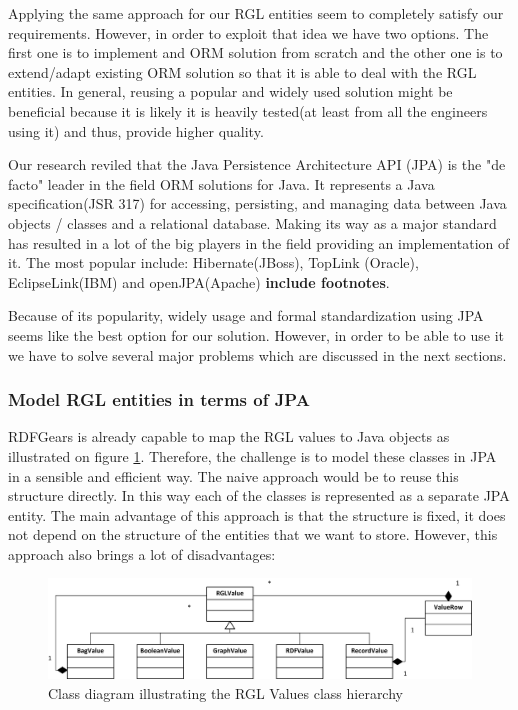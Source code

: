 Applying the same approach for our RGL entities seem to completely satisfy our requirements. However, in order to exploit that idea we have two options. The first one is to implement and ORM solution from scratch and the other one is to extend/adapt existing ORM solution so that it is able to deal with the RGL entities. In general, reusing a popular and widely used solution might be beneficial because it is likely it is heavily tested(at least from all the engineers using it) and thus, provide higher quality. 

Our research reviled that the Java Persistence Architecture API (JPA) is the "de facto" leader in the field ORM solutions for Java. It represents a Java specification(JSR 317) for accessing, persisting, and managing data between Java objects / classes and a relational database. Making its way as a major standard has resulted in a lot of the big players in the field providing an implementation of it. The most popular include: Hibernate(JBoss), TopLink (Oracle), EclipseLink(IBM) and openJPA(Apache) \textbf{include footnotes}. 

Because of its popularity, widely usage and formal standardization using JPA seems like the best option for our solution. However, in order to be able to use it we have to solve several major problems which are discussed in the next sections.


\subsubsection{Model RGL entities in terms of JPA}
RDFGears is already capable to map the RGL values to Java objects as illustrated on figure \ref{fig_rglValuesClassDiag}. Therefore, the challenge is to model these classes in JPA in a sensible and efficient way. The naive approach would be to reuse this structure directly. In this way each of the classes is represented as a separate JPA entity. The main advantage of this approach is that the structure is fixed, it does not depend on the structure of the entities that we want to store. However, this approach also brings a lot of disadvantages: 

\begin{figure}[h!]
  \centering
  	\includegraphics[scale=0.8]{storage/diagrams/RGLValues.png}
  \caption{Class diagram illustrating the RGL Values class hierarchy}
  \label{fig_rglValuesClassDiag}
\end{figure}

